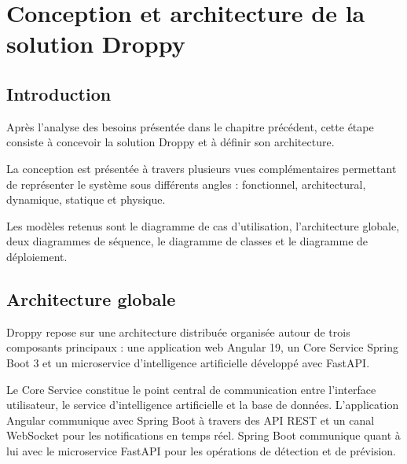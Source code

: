 
\chapter{Conception et architecture de la solution Droppy}


\section{Introduction}

Après l'analyse des besoins présentée dans le chapitre précédent, cette étape
consiste à concevoir la solution Droppy et à définir son architecture.

La conception est présentée à travers plusieurs vues complémentaires permettant
de représenter le système sous différents angles : fonctionnel, architectural,
dynamique, statique et physique.

Les modèles retenus sont le diagramme de cas d'utilisation, l'architecture
globale, deux diagrammes de séquence, le diagramme de classes et le diagramme
de déploiement.



\section{Architecture globale}

Droppy repose sur une architecture distribuée organisée autour de trois
composants principaux : une application web Angular 19, un Core Service
Spring Boot 3 et un microservice d'intelligence artificielle développé avec
FastAPI.

Le Core Service constitue le point central de communication entre l'interface
utilisateur, le service d'intelligence artificielle et la base de données.
L'application Angular communique avec Spring Boot à travers des API REST et
un canal WebSocket pour les notifications en temps réel. Spring Boot
communique quant à lui avec le microservice FastAPI pour les opérations de
détection et de prévision.


